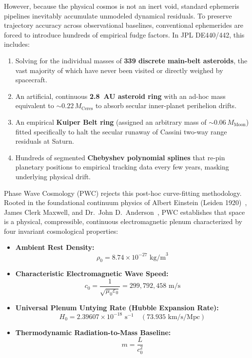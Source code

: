 \documentclass[11pt,a4paper]{article}
\begin{document}
However, because the physical cosmos is not an inert void, standard ephemeris pipelines inevitably accumulate unmodeled dynamical residuals. To preserve trajectory accuracy across observational baselines, conventional ephemerides are forced to introduce hundreds of empirical fudge factors. In JPL DE440/442, this includes:
\begin{enumerate}
    \item Solving for the individual masses of \textbf{339 discrete main-belt asteroids}, the vast majority of which have never been visited or directly weighed by spacecraft.
    \item An artificial, continuous \textbf{2.8~AU asteroid ring} with an ad-hoc mass equivalent to $\sim 0.22\,M_{\text{Ceres}}$ to absorb secular inner-planet perihelion drifts.
    \item An empirical \textbf{Kuiper Belt ring} (assigned an arbitrary mass of $\sim 0.06\,M_{\text{Moon}}$) fitted specifically to halt the secular runaway of Cassini two-way range residuals at Saturn.
    \item Hundreds of segmented \textbf{Chebyshev polynomial splines} that re-pin planetary positions to empirical tracking data every few years, masking underlying physical drift.
\end{enumerate}

Phase Wave Cosmology (PWC) rejects this post-hoc curve-fitting methodology. Rooted in the foundational continuum physics of Albert Einstein (Leiden 1920)~\cite{Einstein1920}, James Clerk Maxwell, and Dr.~John D.~Anderson~\cite{Anderson1998,Anderson2002}, PWC establishes that space is a physical, compressible, continuous electromagnetic plenum characterized by four invariant cosmological properties:
\begin{itemize}
    \item \textbf{Ambient Rest Density:}
    \begin{equation}
    \rho_0 = 8.74 \times 10^{-27}\text{ kg/m}^3
    \label{eq:plenum_density}
    \end{equation}
    \item \textbf{Characteristic Electromagnetic Wave Speed:}
    \begin{equation}
    c_0 = \frac{1}{\sqrt{\mu_0 \varepsilon_0}} = 299{,}792{,}458\text{ m/s}
    \label{eq:plenum_c0}
    \end{equation}
    \item \textbf{Universal Plenum Untying Rate (Hubble Expansion Rate):}
    \begin{equation}
    H_0 = 2.39607 \times 10^{-18}\text{ s}^{-1} \quad (73.935\text{ km/s/Mpc})
    \label{eq:plenum_h0}
    \end{equation}
    \item \textbf{Thermodynamic Radiation-to-Mass Baseline:}
    \begin{equation}
    m = \frac{L}{c_0^2}
    \label{eq:plenum_mass_energy}
    \end{equation}
\end{itemize}
\end{document}
